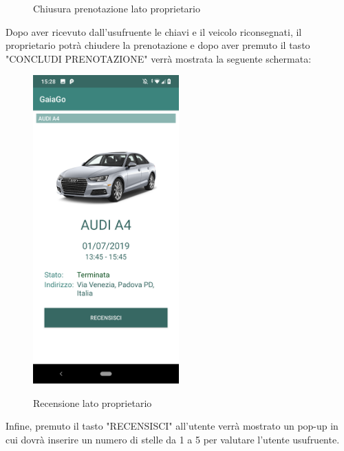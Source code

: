 \begin{itemize}
\begin{figure}[H]
		\caption{Chiusura prenotazione lato proprietario}
		\label{chiusura}
	\end{figure}
\pagebreak
	Dopo aver ricevuto dall'usufruente le chiavi e il veicolo riconsegnati, il proprietario potrà chiudere la prenotazione e dopo aver premuto il tasto "CONCLUDI PRENOTAZIONE" verrà mostrata la seguente schermata:
	\begin{figure}[H] 
		\centering 
		\includegraphics[width=0.5\textwidth]{res/images/recensisci.png}\\
		\caption{Recensione lato proprietario}
		\label{recensione}
	\end{figure}
\pagebreak
	Infine, premuto il tasto "RECENSISCI" all'utente verrà mostrato un pop-up in cui dovrà inserire un numero di stelle da 1 a 5 per valutare l'utente usufruente.
	\begin{figure}[H] 
		\centering 

\end{figure}
\end{itemize}
